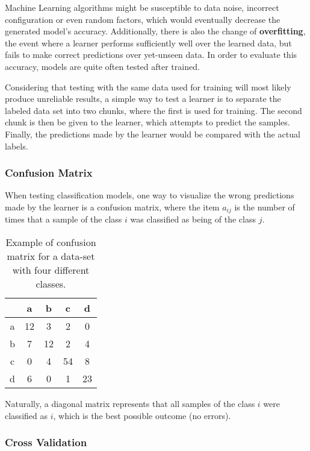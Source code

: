 Machine Learning algorithms might be susceptible to data noise, incorrect configuration or even random factors, which would eventually decrease the generated model's accuracy. Additionally, there is also the change of \textbf{overfitting}, the event where a learner performs sufficiently well over the learned data, but fails to make correct predictions over yet-unseen data. In order to evaluate this accuracy, models are quite often tested after trained.

Considering that testing with the same data used for training will most likely produce unreliable results, a simple way to test a learner is to separate the labeled data set into two chunks, where the first is used for training. The second chunk is then be given to the learner, which attempts to predict the samples. Finally, the predictions made by the learner would be compared with the actual labels.

\subsubsection{Confusion Matrix}

When testing classification models, one way to visualize the wrong predictions made by the learner is a confusion matrix, where the item $a_{ij}$ is the number of times that a sample of the class $i$ was classified as being of the class $j$.

\begin{table}[H]
	\centering
	\begin{tabular}{ |c || *{4}{c|} }
		\hline
           &   a &   b &   c &   d \\\hline\hline
		a & 12 &   3 &   2 &   0 \\
		b &   7 & 12 &   2 &   4 \\
		c &   0 &   4 & 54 &   8 \\
		d &   6 &   0 &   1 & 23 \\\hline
	\end{tabular}

	\caption{Example of confusion matrix for a data-set with four different classes.}
\end{table}

Naturally, a diagonal matrix represents that all samples of the class $i$ were classified as $i$, which is the best possible outcome (no errors).

\subsubsection{Cross Validation}

